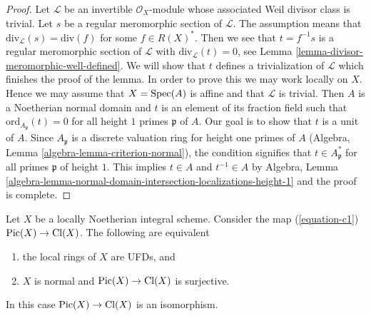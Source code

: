 \begin{proof}
Let $\mathcal{L}$ be an invertible $\mathcal{O}_X$-module whose
associated Weil divisor class is trivial. Let $s$ be a regular
meromorphic section of $\mathcal{L}$. The assumption means that
$\text{div}_\mathcal{L}(s) = \text{div}(f)$ for some
$f \in R(X)^*$. Then we see that $t = f^{-1}s$ is a regular
meromorphic section of $\mathcal{L}$ with
$\text{div}_\mathcal{L}(t) = 0$, see
Lemma \ref{lemma-divisor-meromorphic-well-defined}.
We will show that $t$ defines a trivialization of $\mathcal{L}$
which finishes the proof of the lemma.
In order to prove this we may work locally on $X$.
Hence we may assume that $X = \mathop{\mathrm{Spec}}(A)$ is affine
and that $\mathcal{L}$ is trivial. Then $A$ is a Noetherian normal
domain and $t$ is an element of its fraction field
such that $\text{ord}_{A_\mathfrak p}(t) = 0$
for all height $1$ primes $\mathfrak p$ of $A$.
Our goal is to show that $t$ is a unit of $A$.
Since $A_\mathfrak p$ is a discrete valuation ring for height
one primes of $A$ (Algebra, Lemma \ref{algebra-lemma-criterion-normal}), the
condition signifies that $t \in A_\mathfrak p^*$ for all primes $\mathfrak p$
of height $1$. This implies $t \in A$ and $t^{-1} \in A$ by
Algebra, Lemma
\ref{algebra-lemma-normal-domain-intersection-localizations-height-1}
and the proof is complete.
\end{proof}

\begin{lemma}
\label{lemma-local-rings-UFD-c1-bijective}
Let $X$ be a locally Noetherian integral scheme. Consider the map
(\ref{equation-c1}) $\mathop{\mathrm{Pic}}\nolimits(X) \to \text{Cl}(X)$.
The following are equivalent
\begin{enumerate}
\item the local rings of $X$ are UFDs, and
\item $X$ is normal and $\mathop{\mathrm{Pic}}\nolimits(X) \to \text{Cl}(X)$
is surjective.
\end{enumerate}
In this case $\mathop{\mathrm{Pic}}\nolimits(X) \to \text{Cl}(X)$ is an isomorphism.
\end{lemma}

